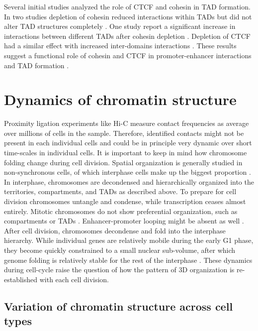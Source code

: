 \documentclass[a4paper,twoside=true,openright,parskip=full,chapterprefix=true,11pt,headings=normal,bibliography=totoc,listof=totoc,titlepage=on,captions=tableabove,draft=false]{scrreprt}
\theoremstyle{definition}
\theoremstyle{definition}
\theoremstyle{definition}
\theoremstyle{remark}
\begin{document}
Several initial studies analyzed the role of CTCF and cohesin in TAD
formation. In two studies depletion of cohesin reduced interactions
within TADs but did not alter TAD structures completely
\citep{Seitan2013, Zuin2014}. One study report a significant increase in
interactions between different TADs after cohesin depletion
\citep{Sofueva2013}. Depletion of CTCF had a similar effect with
increased inter-domains interactions \citep{Seitan2013, Zuin2014}. These
results suggest a functional role of cohesin and CTCF in
promoter-enhancer interactions and TAD formation \citep{Pombo2015}.

\hypertarget{dynamics-of-chromatin-structure}{%
\section{Dynamics of chromatin
structure}\label{dynamics-of-chromatin-structure}}

Proximity ligation experiments like Hi-C measure contact frequencies as
average over millions of cells in the sample. Therefore, identified
contacts might not be present in each individual cells and could be in
principle very dynamic over short time-scales in individual cells. It is
important to keep in mind how chromosome folding change during cell
division. Spatial organization is generally studied in non-synchronous
cells, of which interphase cells make up the biggest proportion
\citep{Bouwman2015}. In interphase, chromosomes are decondensed and
hierarchically organized into the territories, compartments, and TADs as
described above. To prepare for cell division chromosomes untangle and
condense, while transcription ceases almost entirely. Mitotic
chromosomes do not show preferential organization, such as compartments
or TADs \citep{Naumova2013}. Enhancer-promoter looping might be absent
as well \citep{Dekker2014}. After cell division, chromosomes decondense
and fold into the interphase hierarchy. While individual genes are
relatively mobile during the early G1 phase, they become quickly
constrained to a small nuclear sub-volume, after which genome folding is
relatively stable for the rest of the interphase
\citep{Chubb2002, Walter2003}. These dynamics during cell-cycle raise
the question of how the pattern of 3D organization is re-established
with each cell division.

\hypertarget{variation-of-chromatin-structure-across-cell-types}{%
\subsection{Variation of chromatin structure across cell
types}\label{variation-of-chromatin-structure-across-cell-types}}
\end{document}
